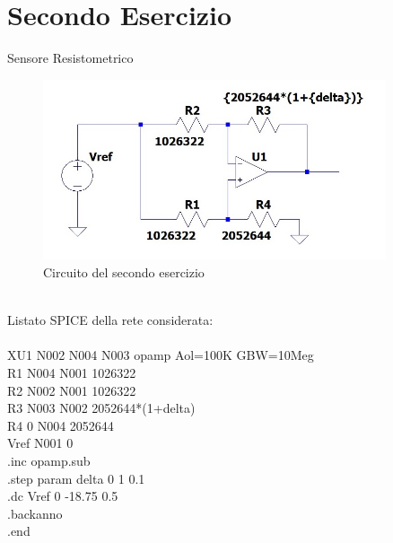 \section{Secondo Esercizio}\label{Sec:SecondoEsercizio}
Sensore Resistometrico
\begin{figure}[h]
    \centering
    \includegraphics[width=0.9\textwidth]{Figure/Circuito2.jpg}
    \caption{Circuito del secondo esercizio}
    \label{fig:Circuito2}
\end{figure}\\
Listato SPICE della rete considerata:\\
\\
XU1 N002 N004 N003 opamp Aol=100K GBW=10Meg\\
R1 N004 N001 1026322\\
R2 N002 N001 1026322\\
R3 N003 N002 {2052644*(1+{delta})}\\
R4 0 N004 2052644\\
Vref N001 0\\
.inc opamp.sub\\
.step param delta 0 1 0.1\\
.dc Vref 0 -18.75 0.5\\
.backanno\\
.end\\

